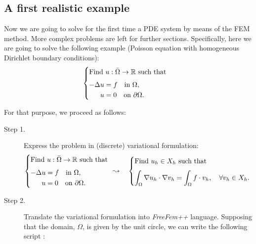 \documentclass[12pt]{article}
\newcommand{\FF}{\textit{FreeFem++}\xspace}
\begin{document}
\subsection{A first realistic example}

Now we are going to solve for the first time a PDE system by means of
the FEM method. More complex problems are left for further sections.
Specifically, here we are going to solve the following example (Poisson
equation with homogeneous Dirichlet boundary conditions):
\begin{equation*}
  \begin{cases}
    \text{Find } u:\bar\Omega \rightarrow \Rset
    \text{ such  that}
    \\\noalign{\medskip}
    \begin{aligned}
      -\Delta u &= f \quad\text{in } \Omega,
      \\
      u &= 0 \quad\text{on } \partial\Omega.
    \end{aligned}
  \end{cases}
\end{equation*}

For that purpose, we proceed as follows:
\begin{description}
\item[Step 1.] Express the problem in (discrete) variational formulation:
  \vspace{-1ex}
  \begin{equation*}
    \begin{cases}
      \text{Find } u:\bar\Omega \rightarrow \Rset
      \text{ such that }
      \\\noalign{\medskip}
      \begin{aligned}
        -\Delta u &= f \quad\text{in } \Omega,
        \\
        u &= 0 \quad\text{on } \partial\Omega.
      \end{aligned}
    \end{cases}
    \hspace{-1em}\leadsto\quad
    \begin{cases}
      \text{Find $u_h\in X_{h}$ such that}
      \\\noalign{\medskip}
      \begin{aligned}
        \int_\Omega \nabla u_h \cdot \nabla v_h = \int_\Omega f \cdot
        v_h,
        \quad \forall v_h\in X_{h}.
      \end{aligned}
    \end{cases}
  \end{equation*}

\item[Step 2.] Translate the variational formulation into \FF
  language.
  Supposing that the domain, $\Omega$, is given by the unit circle, we
  can write the following script :


\end{description}
\end{document}
